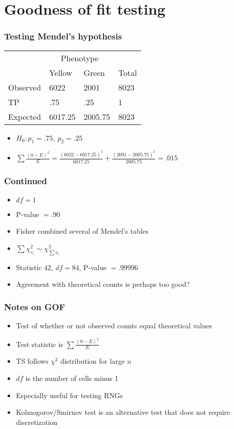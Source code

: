 \documentclass[aspectratio=169]{beamer}
\begin{document}
\section{Goodness of fit testing}
\begin{frame}\frametitle{Testing Mendel's hypothesis}
\begin{center}  
\ttfamily
\begin{tabular}{llll}
                 & \multicolumn{2}{c}{Phenotype} \\
                 & Yellow  & Green   & Total \\ \hline
Observed         & 6022    & 2001    & 8023\\
TP               & .75     & .25     & 1   \\ 
Expected         & 6017.25 & 2005.75 & 8023\\ \hline 
\end{tabular}
\normalfont
\end{center}
\begin{itemize}
\item $H_0:p_1 = .75, ~ p_2 = .25$ 
\item $\sum \frac{(0-E)^2}{E} = \frac{(6022 - 6017.25)^2}{6017.25} +
  \frac{(2001 - 2005.75)^2}{2005.75} = .015$
\end{itemize}
\end{frame}

\begin{frame}\frametitle{Continued}
\begin{itemize}
\item $df = 1$
\item P-value $= .90$
\item Fisher combined several of Mendel's tables
\item $\sum \chi^2_{v_i} \sim \chi^2_{\sum v_i}$
\item Statistic $42$, $df = 84$, P-value $= .99996$
\item Agreement with theoretical counts is perhaps too good?
\end{itemize}
\end{frame}

\begin{frame}\frametitle{Notes on GOF}
\begin{itemize}
\item Test of whether or not observed 
  counts equal theoretical values
\item Test statistic is $\sum \frac{(0-E)^2}{E}$
\item TS follows $\chi^2$ distribution for large $n$
\item $df$ is the number of cells minus 1
\item Especially useful for testing RNGs
\item Kolmogorov/Smirnov test is an  alternative 
  test that does not require  discretization 
\end{itemize}
\end{frame}
\end{document}
